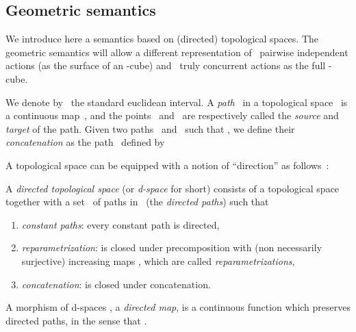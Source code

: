\documentclass[orivec]{llncs} \usepackage[T1]{fontenc}
\newcommand{\comment}[1]{}
\newcommand{\nbd}{\nobreakdash-\hspace{0pt}}
\begin{document}
\subsection{Geometric semantics}
\label{geomsem}

We introduce here a semantics based on
(directed) topological spaces. The geometric semantics will allow a
different representation of~ pairwise independent actions (as the surface of
an -cube) and~ truly concurrent actions as the full -cube.

We denote by~ the standard euclidean interval. A
\emph{path}~ in a topological space~ is a continuous map~, and
the points~ and~ are respectively called the \emph{source} and
\emph{target} of the path. Given two paths~ and~ such that , we
define their \emph{concatenation} as the path~ defined by


A topological space can be equipped with a notion of ``direction'' as
follows~\cite{grandis}:

\begin{definition}
  A \emph{directed topological space} (or \emph{d-space} for short) 
  consists of a topological space~ together with a set~ of paths in~
  (the \emph{directed paths}) such that
  \begin{enumerate}
  \item \emph{constant paths}: every constant path is directed,
  \item \emph{reparametrization}:  is closed under precomposition with (non
    necessarily surjective) increasing maps \hbox{}, which are called
    \emph{reparametrizations},
  \item \emph{concatenation}:  is closed under concatenation.
  \end{enumerate}
  A morphism of d-spaces , a \emph{directed map}, is a continuous
  function \hbox{} which preserves directed paths, in the sense that
  .
\end{definition}

\comment{\begin{example}
  Every topological space~ equipped with a partial order~ defines a
  d\nbd{}space by taking~ the set of paths~ which are increasing.
In particular, we often write~ for the d-space induced by the unit
  interval \hbox{} equipped with the usual total order. Notice that
  given a d-space~, the maps \hbox{} are the directed paths
  in~ and the maps~ are the reparametrizations.
\end{example}
}


\comment{\begin{wrapfigure}{r}{1cm}
  \vspace{-2.5ex}
  \begin{tikzpicture}[scale=0.5]
    \draw (1,1) circle (1);
    \draw[->] (2,1.01) -- (2,0.99);
    \draw[->] (0,0.99) -- (0,1.01);
  \end{tikzpicture}
\end{wrapfigure}
The circle~ in the complex plane
can be equipped with a structure of d-space with~ being the set of
paths~ of the form~ for some increasing
function~. Notice that in this case, the structure of directed spaces
is not induced by a partial order on the space, which makes d-spaces a more
general notion. \bigskip
}
\end{document}
